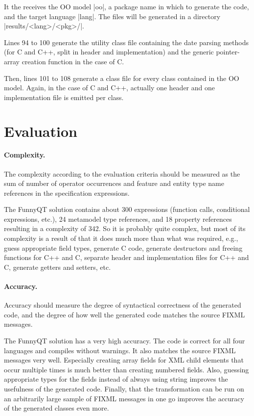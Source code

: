 \documentclass[a4paper]{article}
\newcommand{\code}{\clojureinline}
\begin{document}
It the receives the OO model \code|oo|, a package name in which to generate the
code, and the target language \code|lang|.  The files will be generated in a
directory \code|results/<lang>/<pkg>/|.

Lines 94 to 100 generate the utility class file containing the date parsing
methods (for C and C++, split in header and implementation) and the generic
pointer-array creation function in the case of C.

Then, lines 101 to 108 generate a class file for every class contained in the
OO model.  Again, in the case of C and C++, actually one header and one
implementation file is emitted per class.

\section{Evaluation}
\label{sec:evaluation}

\paragraph{Complexity.}
\label{sec:complexity}

The complexity according to the evaluation criteria should be measured as the
sum of number of operator occurrences and feature and entity type name
references in the specification expressions.

The FunnyQT solution contains about 300 expressions (function calls,
conditional expressions, etc.), 24 metamodel type references, and 18 property
references resulting in a complexity of 342.  So it is probably quite complex,
but most of its complexity is a result of that it does much more than what was
required, e.g., guess appropriate field types, generate C code, generate
destructors and freeing functions for C++ and C, separate header and
implementation files for C++ and C, generate getters and setters, etc.


\paragraph{Accuracy.}
\label{sec:accuracy}

Accuracy should measure the degree of syntactical correctness of the generated
code, and the degree of how well the generated code matches the source FIXML
messages.

The FunnyQT solution has a very high accuracy.  The code is correct for all
four languages and compiles without warnings.  It also matches the source FIXML
messages very well.  Especially creating array fields for XML child elements
that occur multiple times is much better than creating numbered fields.  Also,
guessing appropriate types for the fields instead of always using string
improves the usefulness of the generated code.  Finally, that the
transformation can be run on an arbitrarily large sample of FIXML messages in
one go improves the accuracy of the generated classes even more.
\end{document}
